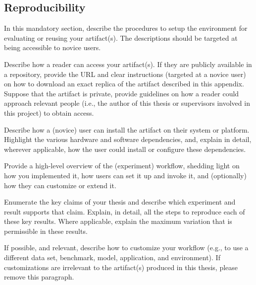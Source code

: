\subsection{Reproducibility}

In this mandatory section, describe the procedures to setup the environment for
evaluating or reusing your artifact(s).
%
The descriptions should be targeted at being accessible to novice users.

%
Describe how a reader can access your artifact(s).
%
If they are publicly available in a repository, provide the URL and clear
instructions (targeted at a novice user) on how to download an exact replica of
the artifact described in this appendix.
%
Suppose that the artifact is private, provide guidelines on how a reader could
approach relevant people (i.e., the author of this thesis or supervisors
involved in this project) to obtain access.

%
Describe how a (novice) user can install the artifact on their system or
platform.
%
Highlight the various hardware and software dependencies, and, explain in
detail, wherever applicable, how the user could install or configure these
dependencies.

%
Provide a high-level overview of the (experiment) workflow, shedding light on
how you implemented it, how users can set it up and invoke it, and (optionally)
how they can customize or extend it.

%
Enumerate the key claims of your thesis and describe which experiment and result
supports that claim.
%
Explain, in detail, all the steps to reproduce each of these key results.
%
Where applicable, explain the maximum variation that is permissible in these
results.

%
If possible, and relevant, describe how to customize your workflow (e.g., to use
a different data set, benchmark, model, application, and environment).
%
If customizations are irrelevant to the artifact(s) produced in this thesis,
please remove this paragraph.



